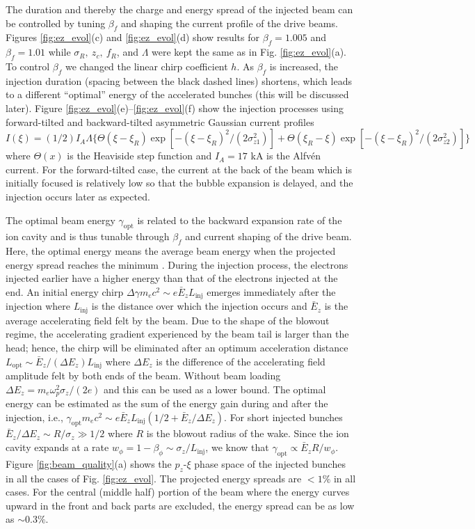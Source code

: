 \documentclass[
aps,
prl,
reprint,
superscriptaddress,
amsmath,
amssymb,
showpacs
]{revtex4-2}
\begin{document}
The duration and thereby the charge and energy spread of the injected beam can be controlled by tuning $\beta_f$ and shaping the current profile of the drive beams. Figures \ref{fig:ez_evol}(c) and \ref{fig:ez_evol}(d) show results for $\beta_f=1.005$ and $\beta_f=1.01$ while $\sigma_R,~z_c,~f_R$, and $\Lambda$ were kept the same as in Fig. \ref{fig:ez_evol}(a). To control $\beta_f$ we changed the linear chirp coefficient $h$. As $\beta_f$ is increased, the injection duration (spacing between the black dashed lines) shortens, which leads to a different ``optimal'' energy of the accelerated bunches (this will be discussed later). Figure \ref{fig:ez_evol}(e)--\ref{fig:ez_evol}(f) show the injection processes using forward-tilted and backward-tilted asymmetric Gaussian current profiles $I(\xi)=(1/2) I_A \Lambda\{\Theta(\xi-\xi_R)\exp[-(\xi-\xi_R)^2/(2\sigma_{z1}^2)]+\Theta(\xi_R-\xi)\exp[-(\xi-\xi_R)^2/(2\sigma_{z2}^2)]\}$ where $\Theta(x)$ is the Heaviside step function and $I_A=17$ kA is the Alfv\'en current. For the forward-tilted case, the current at the back of the beam which is initially focused is relatively low so that the bubble expansion is delayed, and the injection occurs later as expected.

The optimal beam energy $\gamma_\text{opt}$ is related to the backward expansion rate of the ion cavity and is thus tunable through $\beta_f$ and current shaping of the drive beam. Here, the optimal energy means the average beam energy when the projected energy spread reaches the minimum \cite{Xu2017}. During the injection process, the electrons injected earlier have a higher energy than that of the electrons injected at the end. An initial energy chirp $\Delta\gamma m_e c^2\sim e\bar{E}_z L_\text{inj}$ emerges immediately after the injection where $L_\text{inj}$ is the distance over which the injection occurs and $\bar{E}_z$ is the average accelerating field felt by the beam. Due to the shape of the blowout regime, the accelerating gradient experienced by the beam tail is larger than the head; hence, the chirp will be eliminated after an optimum acceleration distance $L_\text{opt}\sim\bar{E}_z/(\Delta E_z ) L_\text{inj}$ where $\Delta E_z$ is the difference of the accelerating field amplitude felt by both ends of the beam. Without beam loading \cite{Tzoufras2008,Dalichaouch2021} $\Delta E_z=m_e\omega_p^2\sigma_z/(2e)$ and this can be used as a lower bound. The optimal energy can be estimated as the sum of the energy gain during and after the injection, i.e., $\gamma_\text{opt} m_e c^2\sim e\bar{E}_z L_\text{inj} (1/2+\bar{E}_z/\Delta E_z)$. For short injected bunches $\bar{E}_z/\Delta E_z\sim R/\sigma_z\gg 1/2$ where $R$ is the blowout radius of the wake. Since the ion cavity expands at a rate $w_\phi=1-\beta_\phi\sim \sigma_z/L_\text{inj}$, we know that $\gamma_\text{opt}\propto \bar{E}_z R/w_\phi$. Figure \ref{fig:beam_quality}(a) shows the $p_z$-$\xi$ phase space of the injected bunches in all the cases of Fig. \ref{fig:ez_evol}. The projected energy spreads are $<1\%$ in all cases. For the central (middle half) portion of the beam where the energy curves upward in the front and back parts are excluded, the energy spread can be as low as $\sim0.3\%$. 
\end{document}
